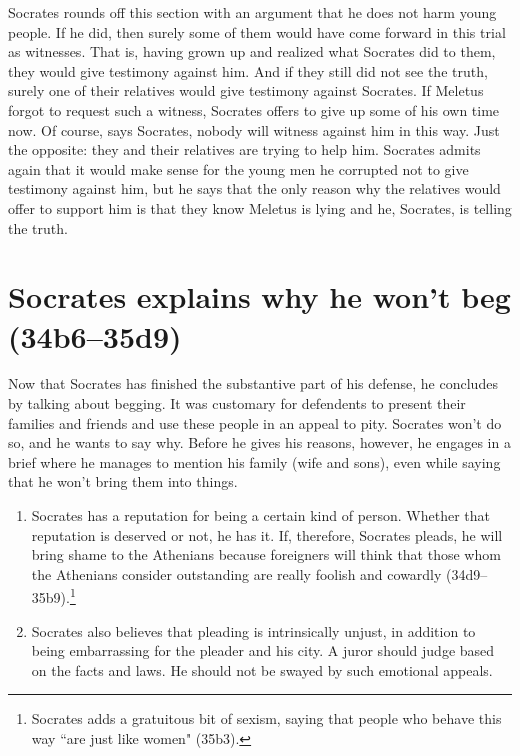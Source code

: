 \documentclass[11pt]{article}
\begin{document}
Socrates rounds off this section with an argument that he does not harm young people.  If he did, then surely some of them would have come forward in this trial as witnesses.  That is, having grown up and realized what Socrates did to them, they would give testimony against him.  And if they still did not see the truth, surely one of their relatives would give testimony against Socrates.  If Meletus forgot to request such a witness, Socrates offers to give up some of his own time now.  Of course, says Socrates, nobody will witness against him in this way.  Just the opposite: they and their relatives are trying to help him.  Socrates admits again that it would make sense for the young men he corrupted not to give testimony against him, but he says that the only reason why the relatives would offer to support him is that they know Meletus is lying and he, Socrates, is telling the truth.

\section{Socrates explains why he won't beg (34b6--35d9)}

Now that Socrates has finished the substantive part of his defense, he concludes by talking about begging.  It was customary for defendents to present their families and friends and use these people in an appeal to pity.  Socrates won't do so, and he wants to say why.  Before he gives his reasons, however, he engages in a brief  where he manages to mention his family (wife and sons), even while saying that he won't bring them into things.

\begin{enumerate}
    \item Socrates has a reputation for being a certain kind of person.  Whether that reputation is deserved or not, he has it. If, therefore, Socrates pleads, he will bring shame to the Athenians because foreigners will think that those whom the Athenians consider outstanding are really foolish and cowardly (34d9--35b9).\footnote{Socrates adds a gratuitous bit of sexism, saying that people who behave this way ``are just like women" (35b3).}
    \item Socrates also believes that pleading is intrinsically unjust, in addition to being embarrassing for the pleader and his city.  A juror should judge based on the facts and laws.  He should not be swayed by such emotional appeals.
\end{enumerate}




\newpage


\end{document}
